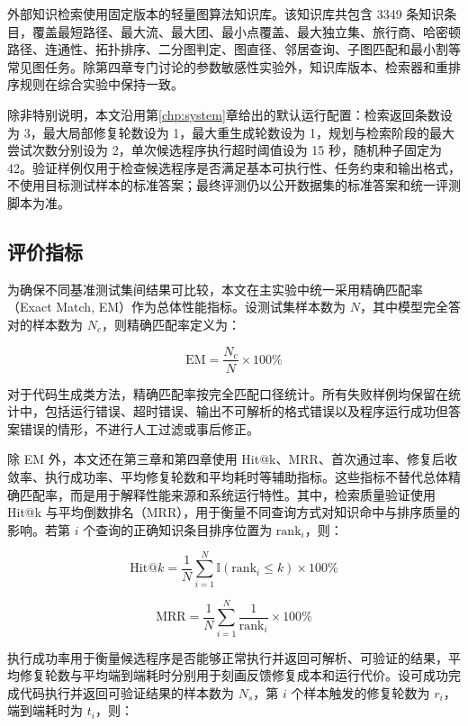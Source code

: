 外部知识检索使用固定版本的轻量图算法知识库。该知识库共包含 3349 条知识条目，覆盖最短路径、最大流、最大团、最小点覆盖、最大独立集、旅行商、哈密顿路径、连通性、拓扑排序、二分图判定、图直径、邻居查询、子图匹配和最小割等常见图任务。除第四章专门讨论的参数敏感性实验外，知识库版本、检索器和重排序规则在综合实验中保持一致。

除非特别说明，本文沿用第\ref{chp:system}章给出的默认运行配置：检索返回条数设为 3，最大局部修复轮数设为 1，最大重生成轮数设为 1，规划与检索阶段的最大尝试次数分别设为 2，单次候选程序执行超时阈值设为 15 秒，随机种子固定为 42。验证样例仅用于检查候选程序是否满足基本可执行性、任务约束和输出格式，不使用目标测试样本的标准答案；最终评测仍以公开数据集的标准答案和统一评测脚本为准。

\subsection{评价指标}

为确保不同基准测试集间结果可比较，本文在主实验中统一采用精确匹配率（Exact Match, EM）作为总体性能指标。设测试集样本数为 $N$，其中模型完全答对的样本数为 $N_c$，则精确匹配率定义为：

\begin{equation}
\mathrm{EM} = \frac{N_c}{N} \times 100\%
\end{equation}

对于代码生成类方法，精确匹配率按完全匹配口径统计。所有失败样例均保留在统计中，包括运行错误、超时错误、输出不可解析的格式错误以及程序运行成功但答案错误的情形，不进行人工过滤或事后修正。

除 EM 外，本文还在第三章和第四章使用 Hit@k、MRR、首次通过率、修复后收敛率、执行成功率、平均修复轮数和平均耗时等辅助指标。这些指标不替代总体精确匹配率，而是用于解释性能来源和系统运行特性。其中，检索质量验证使用 Hit@k 与平均倒数排名（MRR），用于衡量不同查询方式对知识命中与排序质量的影响。若第 $i$ 个查询的正确知识条目排序位置为 $\mathrm{rank}_i$，则：

\begin{equation}
\mathrm{Hit@}k = \frac{1}{N}\sum_{i=1}^{N}\mathbb{I}(\mathrm{rank}_i \le k)\times 100\%
\end{equation}

\begin{equation}
\mathrm{MRR} = \frac{1}{N}\sum_{i=1}^{N}\frac{1}{\mathrm{rank}_i}\times 100\%
\end{equation}

执行成功率用于衡量候选程序是否能够正常执行并返回可解析、可验证的结果，平均修复轮数与平均端到端耗时分别用于刻画反馈修复成本和运行代价。设可成功完成代码执行并返回可验证结果的样本数为 $N_s$，第 $i$ 个样本触发的修复轮数为 $r_i$，端到端耗时为 $t_i$，则：

